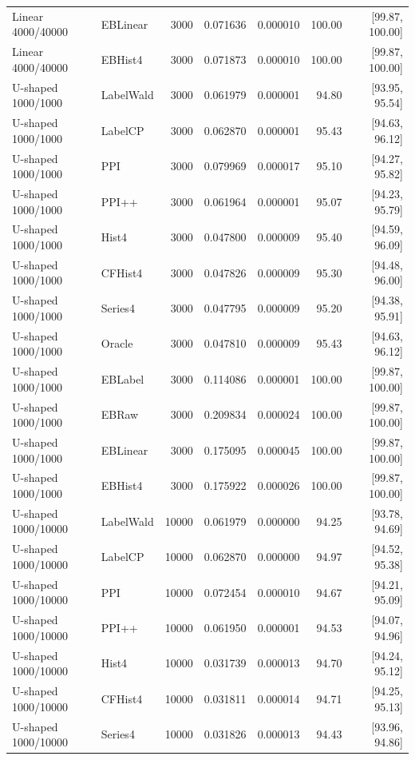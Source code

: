 \begin{longtable}{llrrrrr}
Linear 4000/40000 & EBLinear & 3000 & 0.071636 & 0.000010 & 100.00 & [99.87, 100.00]\\
Linear 4000/40000 & EBHist4 & 3000 & 0.071873 & 0.000010 & 100.00 & [99.87, 100.00]\\
U-shaped 1000/1000 & LabelWald & 3000 & 0.061979 & 0.000001 & 94.80 & [93.95, 95.54]\\
U-shaped 1000/1000 & LabelCP & 3000 & 0.062870 & 0.000001 & 95.43 & [94.63, 96.12]\\
U-shaped 1000/1000 & PPI & 3000 & 0.079969 & 0.000017 & 95.10 & [94.27, 95.82]\\
U-shaped 1000/1000 & PPI++ & 3000 & 0.061964 & 0.000001 & 95.07 & [94.23, 95.79]\\
U-shaped 1000/1000 & Hist4 & 3000 & 0.047800 & 0.000009 & 95.40 & [94.59, 96.09]\\
U-shaped 1000/1000 & CFHist4 & 3000 & 0.047826 & 0.000009 & 95.30 & [94.48, 96.00]\\
U-shaped 1000/1000 & Series4 & 3000 & 0.047795 & 0.000009 & 95.20 & [94.38, 95.91]\\
U-shaped 1000/1000 & Oracle & 3000 & 0.047810 & 0.000009 & 95.43 & [94.63, 96.12]\\
U-shaped 1000/1000 & EBLabel & 3000 & 0.114086 & 0.000001 & 100.00 & [99.87, 100.00]\\
U-shaped 1000/1000 & EBRaw & 3000 & 0.209834 & 0.000024 & 100.00 & [99.87, 100.00]\\
U-shaped 1000/1000 & EBLinear & 3000 & 0.175095 & 0.000045 & 100.00 & [99.87, 100.00]\\
U-shaped 1000/1000 & EBHist4 & 3000 & 0.175922 & 0.000026 & 100.00 & [99.87, 100.00]\\
U-shaped 1000/10000 & LabelWald & 10000 & 0.061979 & 0.000000 & 94.25 & [93.78, 94.69]\\
U-shaped 1000/10000 & LabelCP & 10000 & 0.062870 & 0.000000 & 94.97 & [94.52, 95.38]\\
U-shaped 1000/10000 & PPI & 10000 & 0.072454 & 0.000010 & 94.67 & [94.21, 95.09]\\
U-shaped 1000/10000 & PPI++ & 10000 & 0.061950 & 0.000001 & 94.53 & [94.07, 94.96]\\
U-shaped 1000/10000 & Hist4 & 10000 & 0.031739 & 0.000013 & 94.70 & [94.24, 95.12]\\
U-shaped 1000/10000 & CFHist4 & 10000 & 0.031811 & 0.000014 & 94.71 & [94.25, 95.13]\\
U-shaped 1000/10000 & Series4 & 10000 & 0.031826 & 0.000013 & 94.43 & [93.96, 94.86]\\

\end{longtable}
